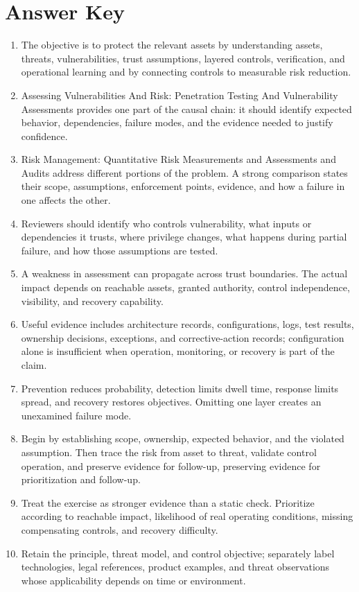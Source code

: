 \documentclass[11pt,letterpaper]{article}
\begin{document}
\section*{Answer Key}
\begin{enumerate}
\item The objective is to protect the relevant assets by understanding assets, threats, vulnerabilities, trust assumptions, layered controls, verification, and operational learning and by connecting controls to measurable risk reduction.
\item Assessing Vulnerabilities And Risk: Penetration Testing And Vulnerability Assessments provides one part of the causal chain: it should identify expected behavior, dependencies, failure modes, and the evidence needed to justify confidence.
\item Risk Management: Quantitative Risk Measurements and Assessments and Audits address different portions of the problem. A strong comparison states their scope, assumptions, enforcement points, evidence, and how a failure in one affects the other.
\item Reviewers should identify who controls vulnerability, what inputs or dependencies it trusts, where privilege changes, what happens during partial failure, and how those assumptions are tested.
\item A weakness in assessment can propagate across trust boundaries. The actual impact depends on reachable assets, granted authority, control independence, visibility, and recovery capability.
\item Useful evidence includes architecture records, configurations, logs, test results, ownership decisions, exceptions, and corrective-action records; configuration alone is insufficient when operation, monitoring, or recovery is part of the claim.
\item Prevention reduces probability, detection limits dwell time, response limits spread, and recovery restores objectives. Omitting one layer creates an unexamined failure mode.
\item Begin by establishing scope, ownership, expected behavior, and the violated assumption. Then trace the risk from asset to threat, validate control operation, and preserve evidence for follow-up, preserving evidence for prioritization and follow-up.
\item Treat the exercise as stronger evidence than a static check. Prioritize according to reachable impact, likelihood of real operating conditions, missing compensating controls, and recovery difficulty.
\item Retain the principle, threat model, and control objective; separately label technologies, legal references, product examples, and threat observations whose applicability depends on time or environment.
\end{enumerate}
\end{document}

